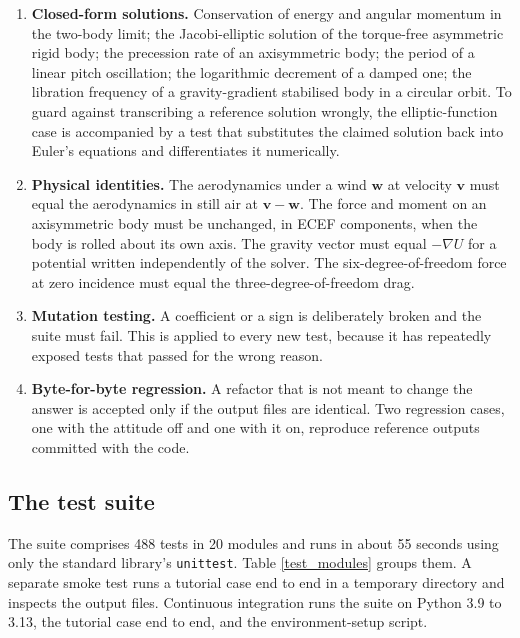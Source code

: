 \documentclass[11pt,a4paper]{article}
\newcommand{\bv}{{\boldsymbol v}}
\begin{document}
\begin{enumerate}
\item \textbf{Closed-form solutions.} Conservation of energy and angular momentum in the
two-body limit; the Jacobi-elliptic solution of the torque-free asymmetric rigid body; the
precession rate of an axisymmetric body; the period of a linear pitch oscillation; the
logarithmic decrement of a damped one; the libration frequency of a gravity-gradient
stabilised body in a circular orbit. To guard against transcribing a reference solution
wrongly, the elliptic-function case is accompanied by a test that substitutes the claimed
solution back into Euler's equations and differentiates it numerically.
\item \textbf{Physical identities.} The aerodynamics under a wind $\boldsymbol{w}$ at
velocity $\bv$ must equal the aerodynamics in still air at $\bv - \boldsymbol{w}$. The
force and moment on an axisymmetric body must be unchanged, in ECEF components, when the
body is rolled about its own axis. The gravity vector must equal $-\nabla U$ for a
potential written independently of the solver. The six-degree-of-freedom force at zero
incidence must equal the three-degree-of-freedom drag.
\item \textbf{Mutation testing.} A coefficient or a sign is deliberately broken and the
suite must fail. This is applied to every new test, because it has repeatedly exposed
tests that passed for the wrong reason.
\item \textbf{Byte-for-byte regression.} A refactor that is not meant to change the answer
is accepted only if the output files are identical. Two regression cases, one with the
attitude off and one with it on, reproduce reference outputs committed with the code.
\end{enumerate}

\subsection{The test suite}

The suite comprises 488 tests in 20 modules and runs in about 55 seconds using only the
standard library's \texttt{unittest}. Table \ref{test_modules} groups them. A separate
smoke test runs a tutorial case end to end in a temporary directory and inspects the
output files. Continuous integration runs the suite on Python 3.9 to 3.13, the tutorial
case end to end, and the environment-setup script.
\end{document}
